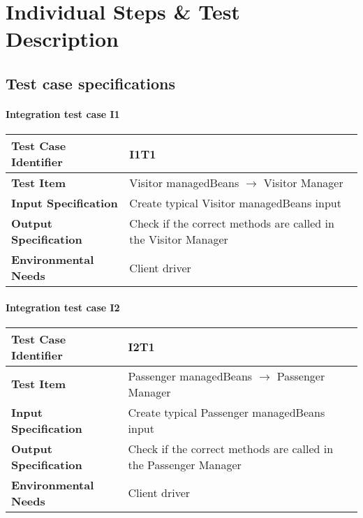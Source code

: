 \chapter{Individual Steps \& Test Description} \label{chap3}

\section{Test case specifications}


\subsubsection{Integration test case I1}

\begin{table}[!htbp]
\begin{center}
\begin{tabular}[t]{p{}p{}}

\hline
\textbf{Test Case Identifier} & I1T1 \\
\hline
\textbf{Test Item} & Visitor managedBeans $\rightarrow$ Visitor Manager \\
\hline
\textbf{Input Specification} & Create typical Visitor managedBeans input  \\
\hline
\textbf{Output Specification} & Check if the correct methods are called in the Visitor Manager \\
\hline
\textbf{Environmental Needs} & Client driver \\
\hline

\end{tabular}
\end{center}
\end{table}
\clearpage


\subsubsection{Integration test case I2}

\begin{table}[!htbp]
\begin{center}
\begin{tabular}[t]{p{}p{}}

\hline
\textbf{Test Case Identifier} & I2T1 \\
\hline
\textbf{Test Item} & Passenger managedBeans $\rightarrow$ Passenger Manager \\
\hline
\textbf{Input Specification} & Create typical Passenger managedBeans input  \\
\hline
\textbf{Output Specification} & Check if the correct methods are called in the Passenger Manager \\
\hline
\textbf{Environmental Needs} & Client driver \\
\hline

\end{tabular}
\end{center}
\end{table}
\clearpage


